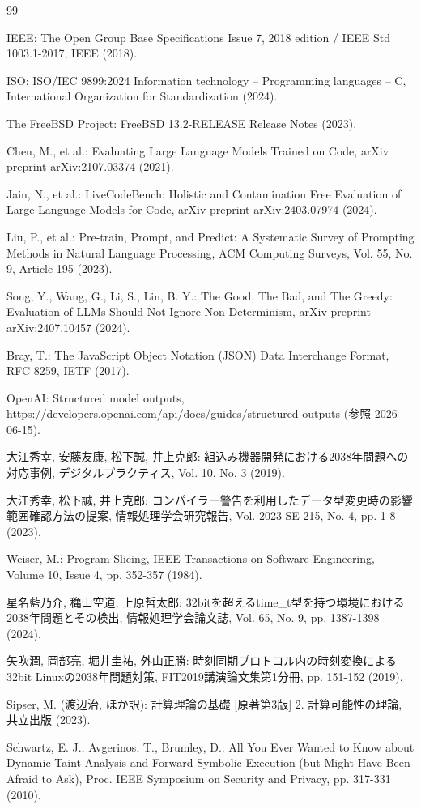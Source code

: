 \documentclass[submit,techrep,noauthor]{ipsj}
\begin{document}
\begin{thebibliography}{99}

IEEE: The Open Group Base Specifications Issue 7, 2018 edition / IEEE Std 1003.1-2017, IEEE (2018).

ISO: ISO/IEC 9899:2024 Information technology -- Programming languages -- C, International Organization for Standardization (2024).

The FreeBSD Project: FreeBSD 13.2-RELEASE Release Notes (2023).

Chen, M., et al.: Evaluating Large Language Models Trained on Code, arXiv preprint arXiv:2107.03374 (2021).

Jain, N., et al.: LiveCodeBench: Holistic and Contamination Free Evaluation of Large Language Models for Code, arXiv preprint arXiv:2403.07974 (2024).

Liu, P., et al.: Pre-train, Prompt, and Predict: A Systematic Survey of Prompting Methods in Natural Language Processing, ACM Computing Surveys, Vol. 55, No. 9, Article 195 (2023).

Song, Y., Wang, G., Li, S., Lin, B. Y.: The Good, The Bad, and The Greedy: Evaluation of LLMs Should Not Ignore Non-Determinism, arXiv preprint arXiv:2407.10457 (2024).

Bray, T.: The JavaScript Object Notation (JSON) Data Interchange Format, RFC 8259, IETF (2017).

OpenAI: Structured model outputs, \url{https://developers.openai.com/api/docs/guides/structured-outputs} (参照 2026-06-15).

大江秀幸, 安藤友康, 松下誠, 井上克郎: 組込み機器開発における2038年問題への対応事例, デジタルプラクティス, Vol. 10, No. 3 (2019).

大江秀幸, 松下誠, 井上克郎: コンパイラー警告を利用したデータ型変更時の影響範囲確認方法の提案, 情報処理学会研究報告, Vol. 2023-SE-215, No. 4, pp. 1-8 (2023).

Weiser, M.: Program Slicing, IEEE Transactions on Software Engineering, Volume 10, Issue 4, pp. 352-357 (1984).

星名藍乃介, 穐山空道, 上原哲太郎: 32bitを超えるtime\_t型を持つ環境における2038年問題とその検出, 情報処理学会論文誌, Vol. 65, No. 9, pp. 1387-1398 (2024).

矢吹潤, 岡部亮, 堀井圭祐, 外山正勝: 時刻同期プロトコル内の時刻変換による32bit Linuxの2038年問題対策, FIT2019講演論文集第1分冊, pp. 151-152 (2019).

Sipser, M. (渡辺治, ほか訳): 計算理論の基礎 [原著第3版] 2. 計算可能性の理論, 共立出版 (2023).

Schwartz, E. J., Avgerinos, T., Brumley, D.: All You Ever Wanted to Know about Dynamic Taint Analysis and Forward Symbolic Execution (but Might Have Been Afraid to Ask), Proc. IEEE Symposium on Security and Privacy, pp. 317-331 (2010).

\end{thebibliography}
\end{document}
